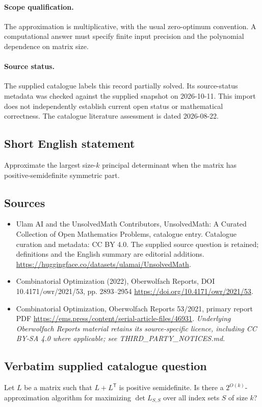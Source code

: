 \documentclass[11pt]{article}
\begin{document}
\paragraph{Scope qualification.}
The approximation is multiplicative, with the usual zero-optimum convention. A computational answer must specify finite input precision and the polynomial dependence on matrix size.
\paragraph{Source status.}
The supplied catalogue labels this record partially solved. Its source-status metadata was checked against the supplied snapshot on 2026-10-11. This import does not independently establish current open status or mathematical correctness. The catalogue literature assessment is dated 2026-08-22.
\subsection{Short English statement}
Approximate the largest size-$k$ principal determinant when the matrix has positive-semidefinite symmetric part.
\subsection{Sources}
\begin{itemize}
\item[S1] Ulam AI and the UnsolvedMath Contributors, UnsolvedMath: A Curated Collection of Open Mathematics Problems, catalogue entry. Catalogue curation and metadata: CC BY 4.0. The supplied source question is retained; definitions and the English summary are editorial additions.
\url{https://huggingface.co/datasets/ulamai/UnsolvedMath}.
\item[S2] Combinatorial Optimization (2022), Oberwolfach Reports, DOI 10.4171/owr/2021/53, pp. 2893--2954
\url{https://doi.org/10.4171/owr/2021/53}.
\item[S3] Combinatorial Optimization, Oberwolfach Reports 53/2021, primary report PDF
\url{https://ems.press/content/serial-article-files/46931}.
\textit{Underlying Oberwolfach Reports material retains its source-specific licence, including CC BY-SA 4.0 where applicable; see THIRD\_PARTY\_NOTICES.md.}
\end{itemize}
\subsection{Verbatim supplied catalogue question}
Let $L$ be a matrix such that $L+L^\mathsf T$ is positive semidefinite. Is there a $2^{O(k)}$-approximation algorithm for maximizing $\det L_{S,S}$ over all index sets $S$ of size $k$?
\end{document}
